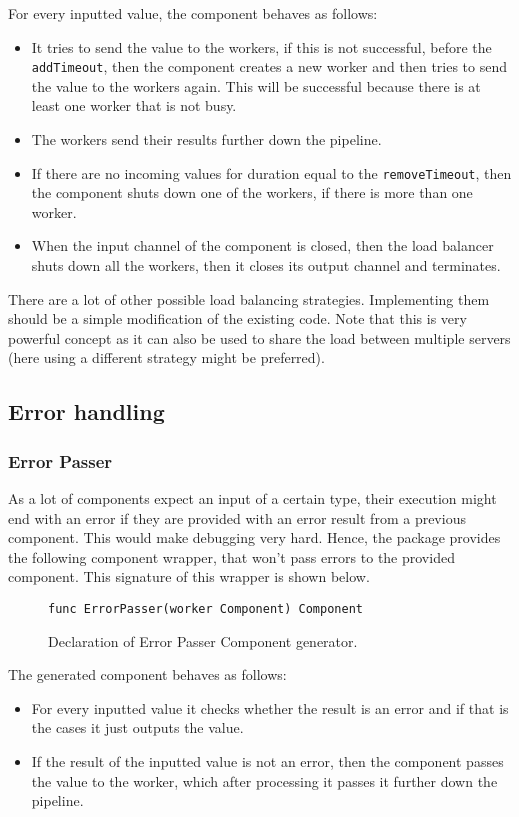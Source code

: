 \documentclass[12pt,a4paper]{article}
\begin{document}
For every inputted value, the component behaves as follows:
\begin{itemize}
	\item It tries to send the value to the workers, if this is not successful, 
		  before the \texttt{addTimeout}, then the component creates a new worker and then
		  tries to send the value to the workers again. This will be successful because
		  there is at least one worker that is not busy.
	\item The workers send their results further down the pipeline.
	\item If there are no incoming values for duration equal to the \texttt{removeTimeout},
          then the component shuts down one of the workers, if there is more than one worker.
	\item When the input channel of the component is closed, then the load balancer shuts down all
		  the workers, then it closes its output channel and terminates.
\end{itemize}
There are a lot of other possible load balancing strategies. 
Implementing them should be a simple modification of the existing code.
Note that this is very powerful concept as it can also be used to share
the load between multiple servers (here using a different strategy might be 
preferred).

\subsection{Error handling}
\subsubsection{Error Passer}
As a lot of components expect an input of a certain type, their execution
might end with an error if they are provided with an error result from
a previous component. This would make debugging very hard. Hence, the 
package provides the following component wrapper, that won't pass errors
to the provided component. This signature of this wrapper is shown below.
\begin{figure}[h]
\centering
\begin{lstlisting}
func ErrorPasser(worker Component) Component
\end{lstlisting}
\caption[scale=1.0]{Declaration of Error Passer Component generator.}
\label{fig:ErrorPasser}
\end{figure}

The generated component behaves as follows:
\begin{itemize}
	\item For every inputted value it checks whether the result is an error
		  and if that is the cases it just outputs the value.
	\item If the result of the inputted value is not an error, then the component
		  passes the value to the worker, which after processing it passes 
		  it further down the pipeline.
\end{itemize}
\end{document}
